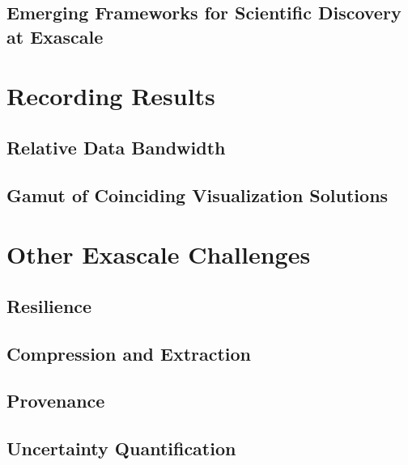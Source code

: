 \documentclass[conference]{IEEEtran}
\begin{document}
\subsection{Emerging Frameworks for Scientific Discovery at Exascale}

\noindent

\section{Recording Results}
\label{sec:RecordingResults}

\noindent

\subsection{Relative Data Bandwidth}

\noindent

\subsection{Gamut of Coinciding Visualization Solutions}

\noindent

\section{Other Exascale Challenges}
\label{sec:Other}

\noindent

\subsection{Resilience}

\noindent

\subsection{Compression and Extraction}

\noindent

\subsection{Provenance}

\noindent

\subsection{Uncertainty Quantification}
\end{document}
